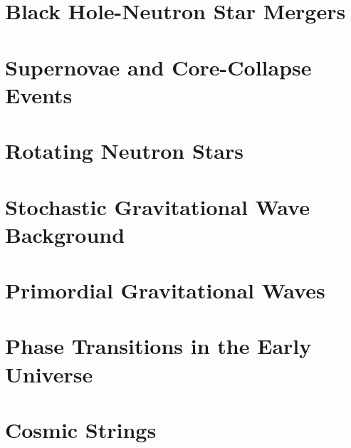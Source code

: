 \section{Black Hole-Neutron Star Mergers}\label{sec:black-hole-neutron-star-mergers}
\section{Supernovae and Core-Collapse Events}\label{sec:supernovae-and-core-collapse-events}
\section{Rotating Neutron Stars}\label{sec:rotating-neutron-stars}
\section{Stochastic Gravitational Wave Background}\label{sec:stochastic-gravitational-wave-background}
\section{Primordial Gravitational Waves}\label{sec:primordial-gravitational-waves}
\section{Phase Transitions in the Early Universe}\label{sec:phase-transitions-in-the-early-universe}
\section{Cosmic Strings}\label{sec:cosmic-strings}